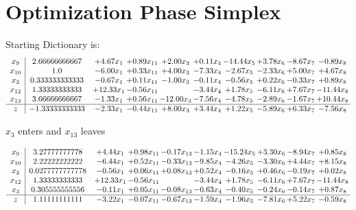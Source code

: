 \documentclass[9pt]{article}
\begin{document}
\section{Optimization Phase Simplex}
Starting Dictionary is:
\[\begin{array}{c| c c@{\hskip 2pt} c@{\hskip 2pt} c@{\hskip 2pt} c@{\hskip 2pt} c@{\hskip 2pt} c@{\hskip 2pt} c@{\hskip 2pt} c@{\hskip 2pt} }
 x_{9}   &  2.66666666667 & +  4.67 x_{1} & +  0.89 x_{11} & +  2.00 x_{3} & +  0.11 x_{4} & -14.44 x_{5} & +  3.78 x_{6} & -8.67 x_{7} & -0.89 x_{8}\\
 x_{10}   &  1.0 & -6.00 x_{1} & +  0.33 x_{11} & +  4.00 x_{3} & -7.33 x_{4} & -2.67 x_{5} & -2.33 x_{6} & +  5.00 x_{7} & +  4.67 x_{8}\\
 x_{2}   &  0.333333333333 & -0.67 x_{1} & +  0.11 x_{11} & -1.00 x_{3} & -0.11 x_{4} & -0.56 x_{5} & +  0.22 x_{6} & -0.33 x_{7} & +  0.89 x_{8}\\
 x_{12}   &  1.33333333333 & + 12.33 x_{1} & -0.56 x_{11} &   & -3.44 x_{4} & +  1.78 x_{5} & -6.11 x_{6} & +  7.67 x_{7} & -11.44 x_{8}\\
 x_{13}   &  3.66666666667 & -1.33 x_{1} & +  0.56 x_{11} & -12.00 x_{3} & -7.56 x_{4} & -4.78 x_{5} & -2.89 x_{6} & -1.67 x_{7} & + 10.44 x_{8}\\
\hline
z    &  -1.33333333333 & -2.33 x_{1} & -0.44 x_{11} & +  8.00 x_{3} & +  3.44 x_{4} & +  1.22 x_{5} & -5.89 x_{6} & +  6.33 x_{7} & -7.56 x_{8}\\
\end{array}\]


 $ x_{3} $ enters and $ x_{13} $ leaves 

 \[\begin{array}{c| c c@{\hskip 2pt} c@{\hskip 2pt} c@{\hskip 2pt} c@{\hskip 2pt} c@{\hskip 2pt} c@{\hskip 2pt} c@{\hskip 2pt} c@{\hskip 2pt} }
 x_{9}   &  3.27777777778 & +  4.44 x_{1} & +  0.98 x_{11} & -0.17 x_{13} & -1.15 x_{4} & -15.24 x_{5} & +  3.30 x_{6} & -8.94 x_{7} & +  0.85 x_{8}\\
 x_{10}   &  2.22222222222 & -6.44 x_{1} & +  0.52 x_{11} & -0.33 x_{13} & -9.85 x_{4} & -4.26 x_{5} & -3.30 x_{6} & +  4.44 x_{7} & +  8.15 x_{8}\\
 x_{2}   &  0.0277777777778 & -0.56 x_{1} & +  0.06 x_{11} & +  0.08 x_{13} & +  0.52 x_{4} & -0.16 x_{5} & +  0.46 x_{6} & -0.19 x_{7} & +  0.02 x_{8}\\
 x_{12}   &  1.33333333333 & + 12.33 x_{1} & -0.56 x_{11} &   & -3.44 x_{4} & +  1.78 x_{5} & -6.11 x_{6} & +  7.67 x_{7} & -11.44 x_{8}\\
 x_{3}   &  0.305555555556 & -0.11 x_{1} & +  0.05 x_{11} & -0.08 x_{13} & -0.63 x_{4} & -0.40 x_{5} & -0.24 x_{6} & -0.14 x_{7} & +  0.87 x_{8}\\
\hline
z    &  1.11111111111 & -3.22 x_{1} & -0.07 x_{11} & -0.67 x_{13} & -1.59 x_{4} & -1.96 x_{5} & -7.81 x_{6} & +  5.22 x_{7} & -0.59 x_{8}\\
\end{array}\]
\end{document}
